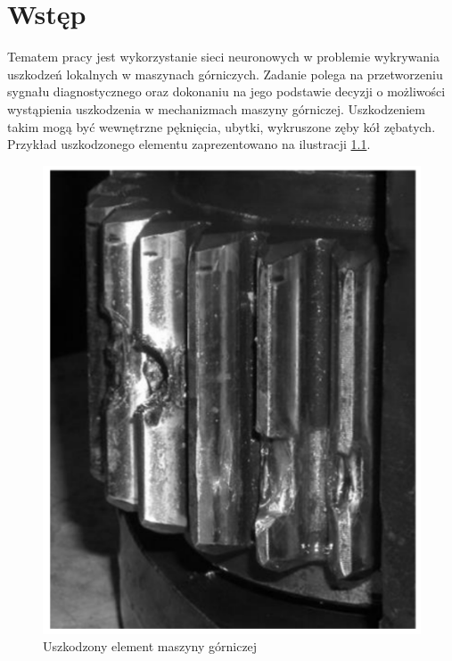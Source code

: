 \documentclass[inzynierska]{pwr_wmat_praca_dyplomowa}
\theoremstyle{plain}
\numberwithin{theorem}{chapter}
\theoremstyle{definition}
\numberwithin{theorem}{chapter}
\begin{document}
\frontmatter
\maketitle
\mainmatter
\tableofcontents



{\backmatter \chapter{Wstęp}}
\label{chap:wstep}

Tematem pracy jest wykorzystanie sieci neuronowych w problemie wykrywania uszkodzeń lokalnych w maszynach górniczych. Zadanie polega na przetworzeniu sygnału diagnostycznego oraz dokonaniu na jego podstawie decyzji o możliwości wystąpienia uszkodzenia w mechanizmach maszyny górniczej. Uszkodzeniem takim mogą być wewnętrzne pęknięcia, ubytki, wykruszone zęby kół zębatych. Przykład uszkodzonego elementu zaprezentowano na ilustracji \ref{uszkodzenie}.
\begin{figure}[ht]
	
	\centering
	
	\includegraphics[scale=0.5]{images/uszkodzenie_kolko.png}
	\caption{Uszkodzony element maszyny górniczej}
	\label{uszkodzenie}
\end{figure}
\end{document}
